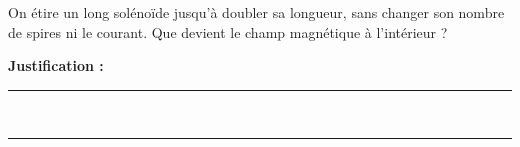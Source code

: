 On étire un long solénoïde jusqu'à doubler sa longueur, sans changer son nombre de spires ni le courant. Que devient le champ magnétique à l'intérieur ?

\choices

\noindent\textbf{Justification :} \hrulefill \\[2.5ex]
\rule{\linewidth}{0.4pt} \\[2.5ex]
\rule{\linewidth}{0.4pt}
\vfill

